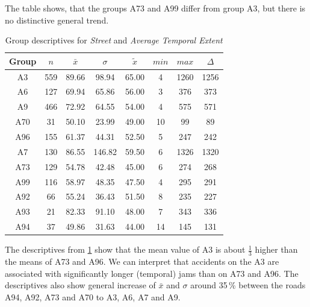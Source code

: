 The table shows, that the groups A73 and A99 differ from group A3, but there is no distinctive general trend.
\begin{table}[ht!]
	\tiny
	\centering
	\begin{tabular}{c|c|c|c|c|c|c|c}
		\toprule
		Group & $n$ & $\bar{x}$ & $\sigma$ & $\tilde{x}$ & $min$ & $max$ & $\Delta$ \\  
		\midrule
		A3  & 559 & 89.66 & 98.94  & 65.00 & 4  & 1260 & 1256 \\ 
		A6  & 127 & 69.94 & 65.86  & 56.00 & 3  & 376  & 373  \\ 
		A9  & 466 & 72.92 & 64.55  & 54.00 & 4  & 575  & 571  \\ 
		A70 & 31  & 50.10 & 23.99  & 49.00 & 10 & 99   & 89   \\ 
		A96 & 155 & 61.37 & 44.31  & 52.50 & 5  & 247  & 242  \\ 
		A7  & 130 & 86.55 & 146.82 & 59.50 & 6  & 1326 & 1320 \\ 
		A73 & 129 & 54.78 & 42.48  & 45.00 & 6  & 274  & 268  \\ 
		A99 & 116 & 58.97 & 48.35  & 47.50 & 4  & 295  & 291  \\ 
		A92 & 66  & 55.24 & 36.43  & 51.50 & 8  & 235  & 227  \\ 
		A93 & 21  & 82.33 & 91.10  & 48.00 & 7  & 343  & 336  \\ 
		A94 & 37  & 49.86 & 31.63  & 44.00 & 14 & 145  & 131  \\ 
		\bottomrule
	\end{tabular}
	\caption{Group descriptives for \textit{Street} and \textit{Average Temporal Extent}}
	\label{tbl:descriptives_baysis_matched_Str_TAvg}
\end{table}
The descriptives from \cref{tbl:descriptives_baysis_matched_Str_TAvg} show that the mean value of A3 is about $\frac{1}{3}$ higher than the means of A73 and A96. We can interpret that accidents on the A3 are associated with significantly longer (temporal) jams than on A73 and A96. The descriptives also show general increase of $\bar{x}$ and $\sigma$ around 35\,\% between the roads A94, A92, A73 and A70 to A3, A6, A7 and A9.

